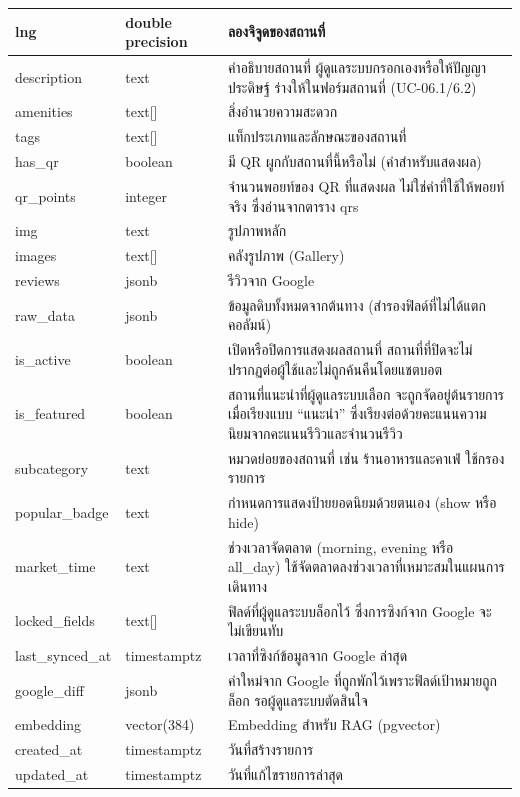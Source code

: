 {\begin{longtable}{|p{3.6cm}|p{2.6cm}|p{6.8cm}|}
lng & double precision & ลองจิจูดของสถานที่ \\ \hline
description & text & คำอธิบายสถานที่ ผู้ดูแลระบบกรอกเองหรือให้ปัญญาประดิษฐ์ ร่างให้ในฟอร์มสถานที่ (UC-06.1/6.2) \\ \hline
amenities & text[] & สิ่งอำนวยความสะดวก \\ \hline
tags & text[] & แท็กประเภทและลักษณะของสถานที่ \\ \hline
has\_qr & boolean & มี QR ผูกกับสถานที่นี้หรือไม่ (ค่าสำหรับแสดงผล) \\ \hline
qr\_points & integer & จำนวนพอยท์ของ QR ที่แสดงผล ไม่ใช่ค่าที่ใช้ให้พอยท์จริง ซึ่งอ่านจากตาราง qrs \\ \hline
img & text & รูปภาพหลัก \\ \hline
images & text[] & คลังรูปภาพ (Gallery) \\ \hline
reviews & jsonb & รีวิวจาก Google \\ \hline
raw\_data & jsonb & ข้อมูลดิบทั้งหมดจากต้นทาง (สำรองฟิลด์ที่ไม่ได้แตกคอลัมน์) \\ \hline
is\_active & boolean & เปิดหรือปิดการแสดงผลสถานที่ สถานที่ที่ปิดจะไม่ปรากฏต่อผู้ใช้และไม่ถูกค้นคืนโดยแชตบอต \\ \hline
is\_featured & boolean & สถานที่แนะนำที่ผู้ดูแลระบบเลือก จะถูกจัดอยู่ต้นรายการเมื่อเรียงแบบ ``แนะนำ'' ซึ่งเรียงต่อด้วยคะแนนความนิยมจากคะแนนรีวิวและจำนวนรีวิว \\ \hline
subcategory & text & หมวดย่อยของสถานที่ เช่น ร้านอาหารและคาเฟ่ ใช้กรองรายการ \\ \hline
popular\_badge & text & กำหนดการแสดงป้ายยอดนิยมด้วยตนเอง (show หรือ hide) \\ \hline
market\_time & text & ช่วงเวลาจัดตลาด (morning, evening หรือ all\_day) ใช้จัดตลาดลงช่วงเวลาที่เหมาะสมในแผนการเดินทาง \\ \hline
locked\_fields & text[] & ฟิลด์ที่ผู้ดูแลระบบล็อกไว้ ซึ่งการซิงก์จาก Google จะไม่เขียนทับ \\ \hline
last\_synced\_at & timestamptz & เวลาที่ซิงก์ข้อมูลจาก Google ล่าสุด \\ \hline
google\_diff & jsonb & ค่าใหม่จาก Google ที่ถูกพักไว้เพราะฟิลด์เป้าหมายถูกล็อก รอผู้ดูแลระบบตัดสินใจ \\ \hline
embedding & vector(384) & Embedding สำหรับ RAG (pgvector) \\ \hline
created\_at & timestamptz & วันที่สร้างรายการ \\ \hline
updated\_at & timestamptz & วันที่แก้ไขรายการล่าสุด \\
\hline
\end{longtable}
\par}


